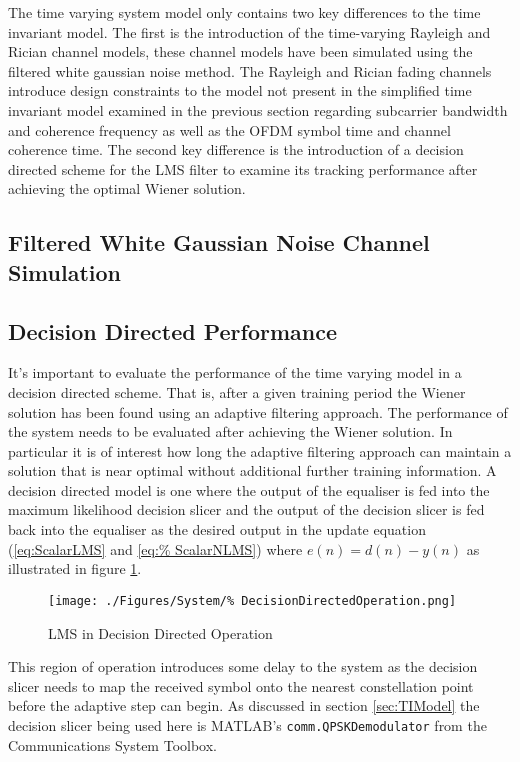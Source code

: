 The time varying system model only contains two key differences to the %
time invariant model. The first is the introduction of the time-varying Rayleigh %
and Rician channel models, these channel models have been simulated using %
the filtered white gaussian noise method. The Rayleigh and Rician fading %
channels introduce design constraints to the model not present in the %
simplified time invariant model examined in the previous section %
regarding subcarrier bandwidth and coherence frequency %
as well as the OFDM symbol time and channel coherence time. The second %
key difference is the introduction of a decision directed scheme for the LMS %
filter to examine its tracking performance after achieving the optimal Wiener solution.

\subsection{Filtered White Gaussian Noise Channel Simulation}

\subsection{Decision Directed Performance}

It's important to evaluate the performance of the time varying model in a %
decision directed scheme. That is, after a given training period the Wiener %
solution has been found using an adaptive filtering approach. The performance %
of the system needs to be evaluated after achieving the Wiener solution. In %
particular it is of interest how long the adaptive filtering approach can %
maintain a solution that is near optimal without additional further training %
information. A decision directed model is one where the output of the %
equaliser is fed into the maximum likelihood decision slicer and the output %
of the decision slicer is fed back into the equaliser as the desired %
output in the update equation (\ref{eq:ScalarLMS} and \ref{eq:%
ScalarNLMS}) where $e(n) = d(n) - y(n)$ as illustrated in figure %
\ref{fig:DDLMS}.
\begin{figure}[ht]
	\texttt{[image: ./Figures/System/\%
	DecisionDirectedOperation.png]}
	\caption{LMS in Decision Directed Operation}
	\label{fig:DDLMS}
\end{figure}
This region of operation introduces some delay to the system as %
the decision slicer needs to map the received symbol onto the %
nearest constellation point before the adaptive step can begin. %
As discussed in section \ref{sec:TIModel} the decision slicer being used %
here is MATLAB's \texttt{comm.QPSKDemodulator} from the %
Communications System Toolbox.

